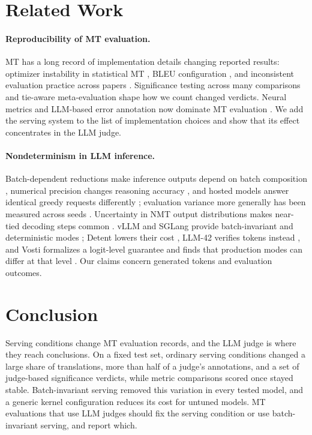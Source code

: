 \section{Related Work}
\paragraph{Reproducibility of MT evaluation.} MT has a long record of implementation details changing reported results: optimizer instability in statistical MT \citep{clark-etal-2011-better}, BLEU configuration \citep{post-2018-call}, and inconsistent evaluation practice across papers \citep{marie-etal-2021-scientific}. Significance testing across many comparisons \citep{koehn-2004-statistical,dror-etal-2017-replicability,dror-etal-2018-hitchhikers} and tie-aware meta-evaluation \citep{deutsch-etal-2023-ties} shape how we count changed verdicts. Neural metrics \citep{rei-etal-2022-comet,juraska-etal-2024-metricx,rei-etal-2023-scaling} and LLM-based error annotation \citep{kocmi2023gemba,kocmi2023gembamqm,fernandes-etal-2023-devil,guerreiro-etal-2024-xcomet} now dominate MT evaluation \citep{kocmi-etal-2021-ship}. We add the serving system to the list of implementation choices and show that its effect concentrates in the LLM judge.
\paragraph{Nondeterminism in LLM inference.} Batch-dependent reductions make inference outputs depend on batch composition \citep{he2025nondeterminism}, numerical precision changes reasoning accuracy \citep{yuan2025numerical}, and hosted models answer identical greedy requests differently \citep{ouyang2023chatgpt,atil2024nondeterminism,song2024greedy}; evaluation variance more generally has been measured across seeds \citep{madaan2024variance,biderman2024lessons}. Uncertainty in NMT output distributions makes near-tied decoding steps common \citep{ott2018uncertainty}. vLLM and SGLang provide batch-invariant and deterministic modes \citep{sglang2025deterministic}; Detent lowers their cost \citep{xin2026detent}, LLM-42 verifies tokens instead \citep{gond2026llm42}, and Vosti formalizes a logit-level guarantee and finds that production modes can differ at that level \citep{qin2026vosti}. Our claims concern generated tokens and evaluation outcomes.

\section{Conclusion}
Serving conditions change MT evaluation records, and the LLM judge is where they reach conclusions. On a fixed test set, ordinary serving conditions changed a large share of translations, more than half of a judge's annotations, and a set of judge-based significance verdicts, while metric comparisons scored once stayed stable. Batch-invariant serving removed this variation in every tested model, and a generic kernel configuration reduces its cost for untuned models. MT evaluations that use LLM judges should fix the serving condition or use batch-invariant serving, and report which.

